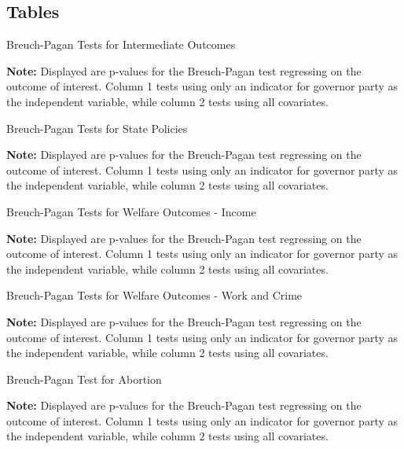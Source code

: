\documentclass{article}
\begin{document}
\subsection{Tables}


\begin{table}[!hbtp]
\caption{Breuch-Pagan Tests for Intermediate Outcomes}

\textbf{Note:} Displayed are p-values for the Breuch-Pagan test regressing on the outcome of interest. Column 1 tests using only an indicator for governor party as the independent variable, while column 2 tests using all covariates. 
\label{table:bp_outcome}
\end{table}

\begin{table}[!hbtp]
\caption{Breuch-Pagan Tests for State Policies}

\textbf{Note:} Displayed are p-values for the Breuch-Pagan test regressing on the outcome of interest. Column 1 tests using only an indicator for governor party as the independent variable, while column 2 tests using all covariates. 
\label{table:bp_policies}
\end{table}

\begin{table}[!hbtp]
\caption{Breuch-Pagan Tests for Welfare Outcomes - Income}

\textbf{Note:} Displayed are p-values for the Breuch-Pagan test regressing on the outcome of interest. Column 1 tests using only an indicator for governor party as the independent variable, while column 2 tests using all covariates. 
\label{table:bp_welfare1}
\end{table}

\begin{table}[!hbtp]
\caption{Breuch-Pagan Tests for Welfare Outcomes - Work and Crime}

\textbf{Note:} Displayed are p-values for the Breuch-Pagan test regressing on the outcome of interest. Column 1 tests using only an indicator for governor party as the independent variable, while column 2 tests using all covariates. 
\label{table:bp_welfare2}
\end{table}

\begin{table}[!hbtp]
\caption{Breuch-Pagan Test for Abortion}

\textbf{Note:} Displayed are p-values for the Breuch-Pagan test regressing on the outcome of interest. Column 1 tests using only an indicator for governor party as the independent variable, while column 2 tests using all covariates. 
\label{table:bp_abortion}
\end{table}
\end{document}
